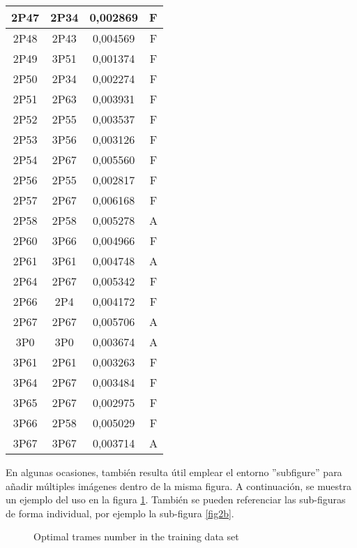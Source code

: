 \begin{center}
\begin{longtable}{|c|c|c|c|}
	\hline	2P47	&	2P34	&	0,002869	&	F	\\
	\hline	2P48	&	2P43	&	0,004569	&	F	\\
	\hline	2P49	&	3P51	&	0,001374	&	F	\\
	\hline	2P50	&	2P34	&	0,002274	&	F	\\
	\hline	2P51	&	2P63	&	0,003931	&	F	\\
	\hline	2P52	&	2P55	&	0,003537	&	F	\\
	\hline	2P53	&	3P56	&	0,003126	&	F	\\
	\hline	2P54	&	2P67	&	0,005560	&	F	\\
	\hline	2P56	&	2P55	&	0,002817	&	F	\\
	\hline	2P57	&	2P67	&	0,006168	&	F	\\
	\hline	2P58	&	2P58	&	0,005278	&	A	\\
	\hline	2P60	&	3P66	&	0,004966	&	F	\\
	\hline	2P61	&	3P61	&	0,004748	&	A	\\
	\hline	2P64	&	2P67	&	0,005342	&	F	\\
	\hline	2P66	&	2P4	&	0,004172	&	F	\\
	\hline	2P67	&	2P67	&	0,005706	&	A	\\
	\hline	3P0	&	3P0	&	0,003674	&	A	\\
	\hline	3P61	&	2P61	&	0,003263	&	F	\\
	\hline	3P64	&	2P67	&	0,003484	&	F	\\
	\hline	3P65	&	2P67	&	0,002975	&	F	\\
	\hline	3P66	&	2P58	&	0,005029	&	F	\\
	\hline	3P67	&	3P67	&	0,003714	&	A	\\
	\end{longtable}
	\end{center}



En algunas ocasiones, también resulta útil emplear el entorno ''subfigure'' para añadir múltiples imágenes dentro de la misma figura. A continuación, se muestra un ejemplo del uso en la figura \ref{fig2}. También se pueden referenciar las sub-figuras de forma individual, por ejemplo la sub-figura \ref{fig2b}.

\begin{figure}[h]
\centerline{
\hfil
{}}
\caption{Optimal trames number in the training data set}
\label{fig2}
\end{figure}

